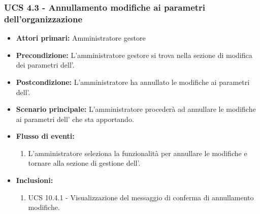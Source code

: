 \subsubsection{UCS 4.3 - Annullamento modifiche ai parametri dell'organizzazione}%
\begin{itemize}
	\item \textbf{Attori primari:} Amministratore gestore
	\item \textbf{Precondizione:} L'amministratore gestore si trova nella sezione di modifica dei parametri dell'.
	\item \textbf{Postcondizione:} L'amministratore ha annullato le modifiche ai parametri dell'.
	\item \textbf{Scenario principale:} L'amministratore procederà ad annullare le modifiche ai parametri dell' che sta apportando.
	\item \textbf{Flusso di eventi:}
	\begin{enumerate}
		\item L'amministratore seleziona la funzionalità per annullare le modifiche e tornare alla sezione di gestione dell'.
	\end{enumerate}
	\item \textbf{Inclusioni:}
	\begin{enumerate}
		\item UCS 10.4.1 - Visualizzazione del messaggio di conferma di annullamento modifiche.
	\end{enumerate}
\end{itemize}